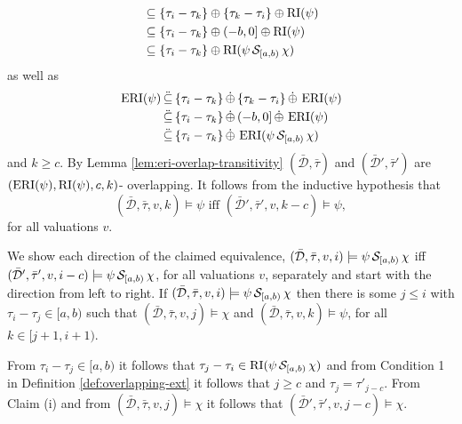 \begin{itemize}
\begin{enumerate}
\begin{align*}
                    &\subseteq \{ \tau_i - \tau_k \} \oplus \{ \tau_k - \tau_i \} \oplus \operatorname{RI}(\psi) \\
                    &\subseteq \{ \tau_i - \tau_k \} \oplus (-b,0] \oplus \operatorname{RI}(\psi) \\
                    &\subseteq \{ \tau_i - \tau_k \} \oplus \operatorname{RI}(\psi \,\mathcal{S}_{[a,b)}\, \chi) \\
                \end{align*}
                as well as
                \begin{align*}
                    \operatorname{ERI}(\psi)
                    &\,\ddot{\subseteq}\, \{ \tau_i - \tau_k \} \,\dot{\oplus}\, \{ \tau_k - \tau_i \} \,\dot{\oplus}\, \operatorname{ERI}(\psi) \\
                    &\,\ddot{\subseteq}\, \{ \tau_i - \tau_k \} \,\dot{\oplus}\, (-b,0] \,\dot{\oplus}\, \operatorname{ERI}(\psi) \\
                    &\,\ddot{\subseteq}\, \{ \tau_i - \tau_k \} \,\dot{\oplus}\, \operatorname{ERI}(\psi \,\mathcal{S}_{[a,b)}\, \chi) \\
                \end{align*}
                and $k \geq c$.
                By Lemma \ref{lem:eri-overlap-transitivity} $(\bar{\mathcal{D}}, \bar{\tau})$ and $(\bar{\mathcal{D}}', \bar{\tau}')$ are $(\operatorname{ERI}(\psi), \operatorname{RI}(\psi), c, k)$- overlapping.
                It follows from the inductive hypothesis that
                \begin{equation*}
                    (\bar{\mathcal{D}}, \bar{\tau}, v, k) \models \psi
                    \text{ iff }
                    (\bar{\mathcal{D}}', \bar{\tau}', v, k-c) \models \psi,
                \end{equation*}
                for all valuations $v$.
                
        \end{enumerate}
        We show each direction of the claimed equivalence, $(\bar{\mathcal{D}}, \bar{\tau}, v, i) \models \psi \,\mathcal{S}_{[a,b)}\, \chi$ iff $(\bar{\mathcal{D}}', \bar{\tau}', v, i-c) \models \psi \,\mathcal{S}_{[a,b)}\, \chi$, for all valuations $v$, separately and start with the direction from left to right.
        If $(\bar{\mathcal{D}}, \bar{\tau}, v, i) \models \psi \,\mathcal{S}_{[a,b)}\, \chi$ then there is some $j \leq i$ with $\tau_i - \tau_j \in [a,b)$ such that $(\bar{\mathcal{D}}, \bar{\tau}, v, j) \models \chi$ and $(\bar{\mathcal{D}}, \bar{\tau}, v, k) \models \psi$, for all $k \in [j+1, i+1)$.

        From $\tau_i - \tau_j \in [a,b)$ it follows that $\tau_j - \tau_i \in \operatorname{RI}(\psi \,\mathcal{S}_{[a,b)}\, \chi)$ and from Condition 1 in Definition \ref{def:overlapping-ext} it follows that $j \geq c$ and $\tau_j = \tau'_{j-c}$.
        From Claim (i) and from $(\bar{\mathcal{D}}, \bar{\tau}, v, j) \models \chi$ it follows that $(\bar{\mathcal{D}}', \bar{\tau}', v, j-c) \models \chi$.


\end{itemize}
